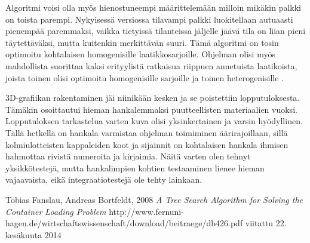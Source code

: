 \documentclass[a4paper,12pt, titlepage]{article}
\begin{document}
Algoritmi voisi olla myös hienostuneempi määrittelemään milloin mikäkin palkki on toista parempi. Nykyisessä versiossa tilavampi palkki luokitellaan autuaasti pienempää paremmaksi, vaikka tietyissä tilanteissa jäljelle jäävä tila on liian pieni täytettäväksi, mutta kuitenkin merkittävän suuri. Tämä algoritmi on tosin optimoitu kohtalaisen homogenisille laatikkosarjoille. Ohjelman olisi myös mahdollista suorittaa kaksi erityylistä ratkaisua riippuen annetuista laatikoista, joista toinen olisi optimoitu homogenisille sarjoille ja toinen heterogenisille \cite{fanslau-bortfeldt}.

3D-grafiikan rakentaminen jäi niinikään kesken ja se poistettiin lopputuloksesta. Tämäkin osoittautui hieman hankalemmaksi puutteellisten materiaalien vuoksi. Lopputuloksen tarkastelua varten kuva olisi yksinkertainen ja varsin hyödyllinen. Tällä hetkellä on hankala varmistaa ohjelman toimiminen äärirajoillaan, sillä kolmiulotteisten kappaleiden koot ja sijainnit on kohtalaisen hankala ihmisen hahmottaa rivistä numeroita ja kirjaimia. Näitä varten olen tehnyt yksikkötestejä, mutta hankalimpien kohtien testaaminen lienee hieman vajaavaista, eikä integraatiotestejä ole tehty lainkaan.

\begin{thebibliography}{9}

  Tobias Fanslau, Andreas Bortfeldt, 2008 \newline
  \emph{A Tree Search Algorithm for Solving the Container Loading Problem }\newline
  http://www.fernuni-hagen.de/wirtschaftswissenschaft/download/beitraege/db426.pdf\newline
  viitattu 22. kesäkuuta 2014

\end{thebibliography}
\end{document}
